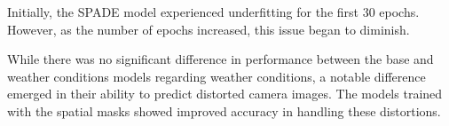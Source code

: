 Initially, the SPADE model experienced underfitting for the first 30 epochs. However, as the number of epochs increased, this issue began to diminish.

While there was no significant difference in performance between the base and weather conditions models regarding weather conditions, a notable difference emerged in their ability to predict distorted camera images. The models trained with the spatial masks showed improved accuracy in handling these distortions.
